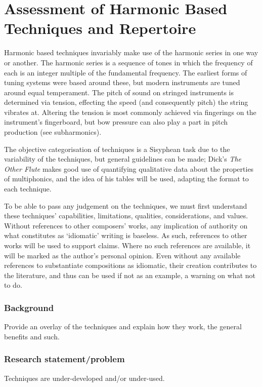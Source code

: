 
\chapter{Assessment of Harmonic Based Techniques and Repertoire}

Harmonic based techniques invariably make use of the harmonic series in one way or another. 
The harmonic series is a sequence of tones in which the frequency of each is an integer multiple of the fundamental frequency. 
The earliest forms of tuning systems were based around these, but modern instruments are tuned around equal temperament. 
The pitch of sound on stringed instruments is determined via tension, effecting the speed (and consequently pitch) the string vibrates at. 
Altering the tension is most commonly achieved via fingerings on the instrument's fingerboard, but bow pressure can also play a part in pitch production (see subharmonics).

The objective categorisation of techniques is a Sisyphean task due to the variability of the techniques, but general guidelines can be made; Dick's \emph{The Other Flute} makes good use of quantifying qualitative data about the properties of multiphonics, and the idea of his tables will be used, adapting the format to each technique.\autocite[84]{dickOtherFlute1989}

To be able to pass any judgement on the techniques, we must first understand these techniques' capabilities, limitations, qualities, considerations, and values. 
Without references to other composers' works, any implication of authority on what constitutes as `idiomatic' writing is baseless. 
As such, references to other works will be used to support claims. 
Where no such references are available, it will be marked as the author's personal opinion. 
Even without any available references to substantiate compositions as idiomatic, their creation contributes to the literature, and thus can be used if not as an example, a warning on what not to do. 

\subsection{Background}
Provide an overlay of the techniques and explain how they work, the general benefits and such.
\subsection{Research statement/problem}
Techniques are under-developed and/or under-used.

